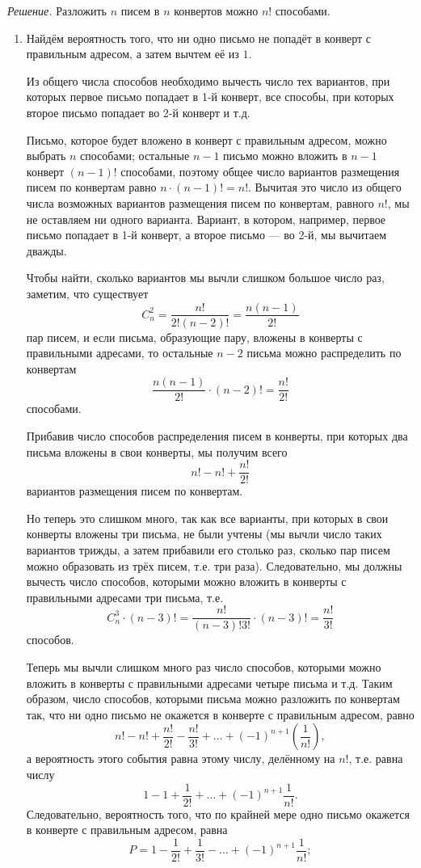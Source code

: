 \textit{Решение.} Разложить $n$ писем в $n$ конвертов можно $n!$ способами.

\begin{enumerate}[label=\alph*)]
\item Найдём вероятность того, что ни одно письмо не попадёт в конверт с правильным адресом, а затем вычтем её из $1$.

Из общего числа способов необходимо вычесть число тех вариантов, при которых первое письмо попадает в 1-й конверт,
все способы, при которых второе письмо попадает во 2-й конверт и т.д.

Письмо, которое будет вложено в конверт с правильным адресом, можно выбрать $n$ способами;
остальные $n - 1$ письмо можно вложить в $n - 1$ конверт $ \left( n - 1 \right)!$ способами,
поэтому общее число вариантов размещения писем по конвертам равно $n \cdot \left( n - 1 \right)! = n!$.
Вычитая это число из общего числа возможных вариантов размещения писем по конвертам, равного $n!$,
мы не оставляем ни одного варианта.
Вариант, в котором, например, первое письмо попадает в 1-й конверт, а второе письмо --- во 2-й, мы вычитаем дважды.

Чтобы найти, сколько вариантов мы вычли слишком большое число раз, заметим, что существует 
$$C_n^2 =
\frac{n!}{2! \left( n-2 \right)!} =
\frac{n \left( n-1 \right) }{2!}$$
пар писем, и если письма, образующие пару, вложены в конверты с правильными адресами, то остальные $n - 2$ письма можно распределить по конвертам
$$\frac{n \left( n-1 \right)}{2!} \cdot \left( n-2 \right)! =
\frac{n!}{2!}$$
способами.

Прибавив число способов распределения писем в конверты, при которых два письма вложены в свои конверты, мы получим всего
$$n! - n! + \frac{n!}{2!}$$
вариантов размещения писем по конвертам.

Но теперь это слишком много,
так как все варианты, при которых в свои конверты вложены три письма, не были учтены
(мы вычли число таких вариантов трижды, а затем прибавили его столько раз,
сколько пар писем можно образовать из трёх писем, т.е. три раза).
Следовательно, мы должны вычесть число способов, которыми можно вложить в конверты с правильными адресами три письма, т.е.
$$C_n^3 \cdot \left( n-3 \right)! =
\frac{n!}{\left( n-3 \right)! 3!}\cdot \left( n-3 \right)! =
\frac{n!}{3!}$$
способов.

Теперь мы вычли слишком много раз число способов,
которыми можно вложить в конверты с правильными адресами четыре письма и т.д.
Таким образом, число способов, которыми письма можно разложить по конвертам так, что ни одно письмо не окажется в конверте с правильным адресом, равно
$$n! - n! + \frac{n!}{2!} - \frac{n!}{3!} + \dotsc + \left( -1 \right)^{n+1} \left( \frac{1}{n!} \right),$$
а вероятность этого события равна этому числу, делённому на $n!$, т.е. равна числу
$$1 - 1 + \frac{1}{2!} + \dotsc + \left( -1 \right)^{n+1} \frac{1}{n!}.$$
Следовательно, вероятность того, что по крайней мере одно письмо окажется в конверте с правильным адресом, равна
$$P =
1 - \frac{1}{2!} + \frac{1}{3!} - \dotsc + \left( -1 \right)^{n+1} \frac{1}{n!};$$


\end{enumerate}
